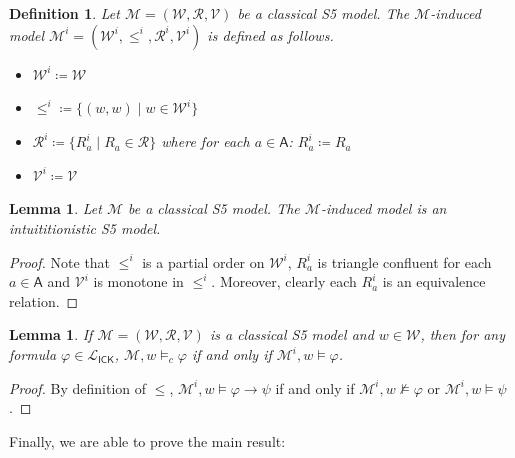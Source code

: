 \documentclass{myifcolog}
\newcommand\A{\mathsf{A}}
\newcommand{\agi}{a}
\newcommand{\ICK}{\mathsf{ICK}}
\newcommand{\LICK}{\mathcal{L}_{\ICK}}
\newcommand{\fw}{\mathcal{M}}
\newcommand{\W}{\mathcal{W}}
\newcommand{\rel}{\mathcal{R}}
\newcommand{\V}{\mathcal{V}}
\newtheorem{definition}[theorem]{Definition}
\newtheorem{lemma}[theorem]{Lemma}
\numberwithin{theorem}{section}
\begin{document}
\begin{definition}
    Let $\fw=(\W, \rel, \V)$ be a classical S5 model. The \emph{$\fw$-induced model} $\fw^i =(\W^i, \leq^i, \rel^i, \V^i)$ is defined as follows.
    \begin{itemize}
        \item $\W^i \coloneqq \W$
        \item $\leq^i \coloneqq \{(w,w) \mid w \in \W^i\}$
        \item $\rel^i \coloneqq \{R_\agi^i \mid R_\agi \in \rel\}$ where for each $\agi \in \A$: $R_\agi^i \coloneqq R_\agi$
        \item $\V^i \coloneqq \V$ 
    \end{itemize}
\end{definition}

\begin{lemma}
    Let $\fw$ be a classical S5 model. The $\fw$-induced model is an intuititionistic S5 model.
\end{lemma}

\begin{proof}
    Note that $\leq^i$ is a partial order on $\W^i$, $R_\agi^i$ is triangle confluent for each $\agi \in \A$ and $\V^i$ is monotone in $\leq^i$. Moreover, clearly each $R_\agi^i$ is an equivalence relation.
\end{proof}

\begin{lemma}\label{l: classical model induces intuitionistic model}
    If $\fw = (\W, \rel, \V) $ is a classical S5 model and $w \in \W$, then for any formula $\varphi \in \LICK$, $\fw, w \models_c \varphi$ if and only if $\fw^i, w \models \varphi$.
\end{lemma}
\begin{proof}
    By definition of $\leq$, $\fw^i, w \models \varphi \rightarrow \psi$ if and only if $\fw^i, w \not \models \varphi$ or $\fw^i, w \models \psi$.
\end{proof}


Finally, we are able to prove the main result:
\end{document}
